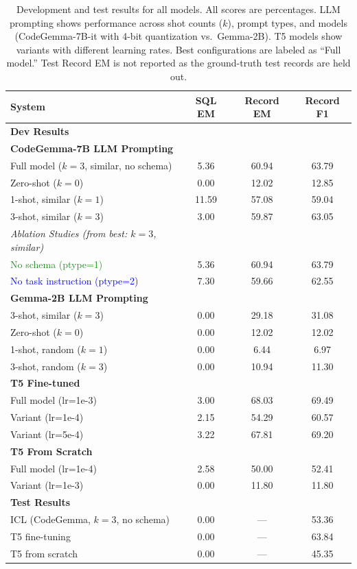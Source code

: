 \documentclass{article}
\begin{document}
\begin{table}[h!]
\centering
\begin{tabular}{lccc}
  \toprule
  System & SQL EM & Record EM & Record F1\\
  \midrule
  \multicolumn{4}{l}{\textbf{Dev Results}} \\
  \midrule
  \multicolumn{4}{l}{\textbf{CodeGemma-7B LLM Prompting}} \\
  Full model ($k{=}3$, similar, no schema) & 5.36 & 60.94 & 63.79 \\
  Zero-shot ($k{=}0$) & 0.00 & 12.02 & 12.85 \\
  1-shot, similar ($k{=}1$) & 11.59 & 57.08 & 59.04 \\
  3-shot, similar ($k{=}3$) & 3.00 & 59.87 & 63.05 \\
  \textit{Ablation Studies (from best: $k{=}3$, similar)} & & & \\
  \textcolor{ForestGreen}{No schema (ptype=1)} & 5.36 & 60.94 & 63.79 \\
  \textcolor{Blue}{No task instruction (ptype=2)} & 7.30 & 59.66 & 62.55 \\[3pt]
  \multicolumn{4}{l}{\textbf{Gemma-2B LLM Prompting}} \\
  3-shot, similar ($k{=}3$) & 0.00 & 29.18 & 31.08 \\
  Zero-shot ($k{=}0$) & 0.00 & 12.02 & 12.02 \\
  1-shot, random ($k{=}1$) & 0.00 & 6.44 & 6.97 \\
  3-shot, random ($k{=}3$) & 0.00 & 10.94 & 11.30 \\[5pt]
  \multicolumn{4}{l}{\textbf{T5 Fine-tuned}} \\
  Full model (lr=1e-3) & 3.00 & 68.03 & 69.49 \\
  Variant (lr=1e-4) & 2.15 & 54.29 & 60.57 \\
  Variant (lr=5e-4) & 3.22 & 67.81 & 69.20 \\[5pt]
  \multicolumn{4}{l}{\textbf{T5 From Scratch}} \\
  Full model (lr=1e-4) & 2.58 & 50.00 & 52.41 \\
  Variant (lr=1e-3) & 0.00 & 11.80 & 11.80 \\
  \midrule
  \multicolumn{4}{l}{\textbf{Test Results}} \\
  \midrule
  ICL (CodeGemma, $k{=}3$, no schema) & 0.00 & \multicolumn{1}{c}{---} & 53.36 \\
  T5 fine-tuning & 0.00 & \multicolumn{1}{c}{---} & 63.84 \\
  T5 from scratch & 0.00 & \multicolumn{1}{c}{---} & 45.35 \\
  \bottomrule
\end{tabular}
\caption{Development and test results for all models. All scores are percentages. LLM prompting shows performance across shot counts ($k$), prompt types, and models (CodeGemma-7B-it with 4-bit quantization vs.\ Gemma-2B). T5 models show variants with different learning rates. Best configurations are labeled as ``Full model.'' Test Record EM is not reported as the ground-truth test records are held out.}
\label{tab:results}
\end{table}
\end{document}
